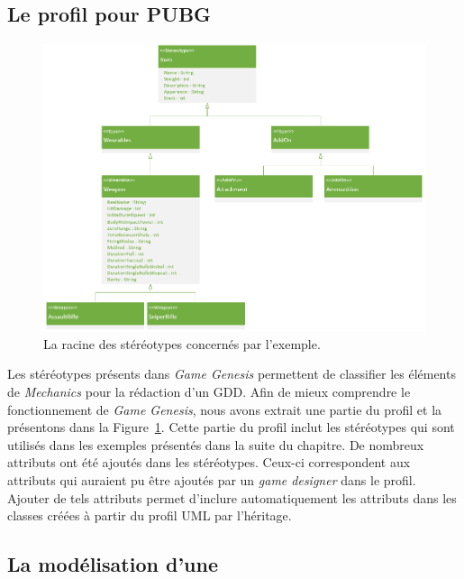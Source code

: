 \subsection{Le profil pour PUBG}

\begin{figure}
    \centering
    \includegraphics[width=14cm]{10_img/chap6/root(stereotypes).PNG} 
    \caption{La racine des stéréotypes concernés par l'exemple.}
    \label{fig.racine_stereo}
\end{figure}

Les stéréotypes présents dans \emph{Game Genesis} permettent de classifier les \'el\'ements de \emph{Mechanics} pour la rédaction d'un GDD.
Afin de mieux comprendre le fonctionnement de \emph{Game Genesis}, nous avons extrait une partie du profil et la pr\'esentons dans la Figure~\ref{fig.racine_stereo}.
Cette partie du profil inclut les stéréotypes qui sont utilisés dans les exemples présentés dans la suite du chapitre.
De nombreux attributs ont été ajoutés dans les stéréotypes. 
Ceux-ci correspondent aux attributs qui auraient pu être ajoutés par un \emph{game designer} dans le profil.
Ajouter de tels attributs permet d'inclure automatiquement les attributs dans les classes créées à partir du profil UML par l'héritage.

\subsection{La modélisation d'une }

